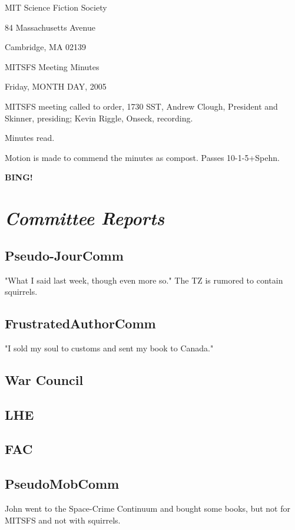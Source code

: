\documentclass[10pt]{article}
\newcommand{\bing}{{\bf BING!} }
\newcommand{\goto}[1]{\bing \vskip 12pt \section*{{\em{#1}}}}
\begin{document}
\begin{center}

MIT Science Fiction Society

84 Massachusetts Avenue

Cambridge, MA 02139

\vspace{12pt}

MITSFS Meeting Minutes

Friday, MONTH DAY, 2005

\end{center}

\vspace{18pt}

\setlength{\parskip}{6pt}

\noindent
MITSFS meeting called to order, 1730 SST, Andrew Clough, President and
Skinner, presiding; Kevin Riggle,  Onseck, recording.

Minutes read.

Motion is made to commend the minutes as compost.  Passes 10-1-5+Spehn.

\goto{Committee Reports}
\subsection*{Pseudo-JourComm}
"What I said last week, though even more so."  The TZ is rumored to contain squirrels.

\subsection*{FrustratedAuthorComm}
"I sold my soul to customs and sent my book to Canada."

\subsection*{War Council}

\subsection*{LHE}

\subsection*{FAC}

\subsection*{PseudoMobComm}
John went to the Space-Crime Continuum and bought some books, but not
for MITSFS and not with squirrels.
\end{document}
